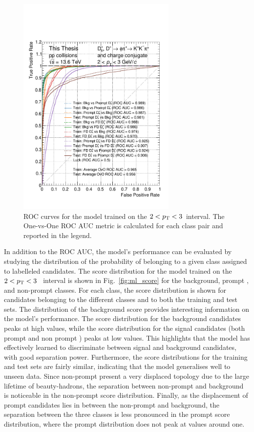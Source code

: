 \begin{figure}[htb]
    \centering
    \includegraphics[width=0.7\textwidth]{Figures/Chapter 5/ROC.pdf}
    \caption{ROC curves for the model trained on the $2<p_\mathrm{T}<3$~\gevc interval. The One-vs-One ROC AUC metric is calculated for each class pair and reported in the legend.}
    \label{fig:ml_roc_curve}
\end{figure}

\begin{sloppypar}
In addition to the ROC AUC, the model's performance can be evaluated by studying the distribution of the probability of belonging to a given class assigned to labelleled candidates. The score distribution for the model trained on the \mbox{$2<p_\mathrm{T}<3$~\gevc} interval is shown in Fig.~\ref{fig:ml_score} for the background, prompt \ds, and non-prompt \ds classes. For each class, the score distribution is shown for candidates belonging to the different classes and to both the training and test sets. The distribution of the background score provides interesting information on the model's performance. The score distribution for the background candidates peaks at high values, while the score distribution for the signal candidates (both prompt and non prompt \ds) peaks at low values. This highlights that the model has effectively learned to discriminate between signal and background candidates, with good separation power. Furthermore, the score distributions for the training and test sets are fairly similar, indicating that the model generalises well to unseen data. Since non-prompt \ds present a very displaced topology due to the large lifetime of beauty-hadrons, the separation between non-prompt \ds and background is noticeable in the non-prompt \ds score distribution. Finally, as the displacement of prompt candidates lies in between the non-prompt \ds and background, the separation between the three classes is less pronounced in the prompt \ds score distribution, where the prompt \ds distribution does not peak at values around one.
\end{sloppypar}


